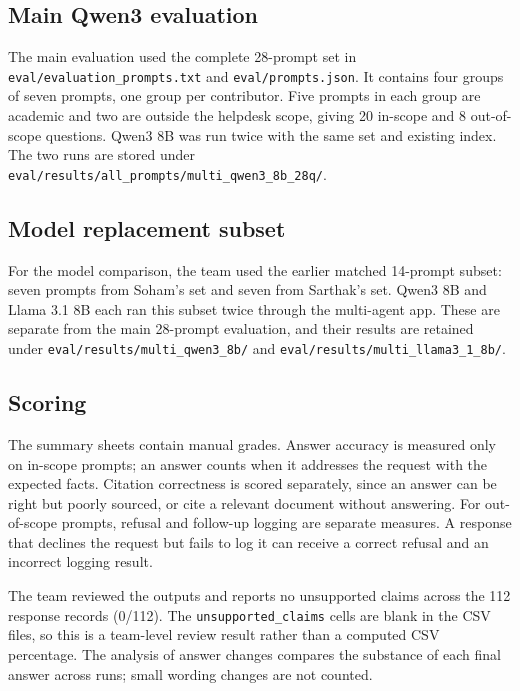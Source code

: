 \documentclass[11pt,a4paper]{article}
\begin{document}
\subsection{Main Qwen3 evaluation}

The main evaluation used the complete 28-prompt set in \texttt{eval/evaluation\_prompts.txt} and \texttt{eval/prompts.json}. It contains four groups of seven prompts, one group per contributor. Five prompts in each group are academic and two are outside the helpdesk scope, giving 20 in-scope and 8 out-of-scope questions. Qwen3 8B was run twice with the same set and existing index. The two runs are stored under \texttt{eval/results/all\_prompts/multi\_qwen3\_8b\_28q/}.

\subsection{Model replacement subset}

For the model comparison, the team used the earlier matched 14-prompt subset: seven prompts from Soham's set and seven from Sarthak's set. Qwen3 8B and Llama 3.1 8B each ran this subset twice through the multi-agent app. These are separate from the main 28-prompt evaluation, and their results are retained under \texttt{eval/results/multi\_qwen3\_8b/} and \texttt{eval/results/multi\_llama3\_1\_8b/}.

\subsection{Scoring}

The summary sheets contain manual grades. Answer accuracy is measured only on in-scope prompts; an answer counts when it addresses the request with the expected facts. Citation correctness is scored separately, since an answer can be right but poorly sourced, or cite a relevant document without answering. For out-of-scope prompts, refusal and follow-up logging are separate measures. A response that declines the request but fails to log it can receive a correct refusal and an incorrect logging result.

The team reviewed the outputs and reports no unsupported claims across the 112 response records (0/112). The \texttt{unsupported\_claims} cells are blank in the CSV files, so this is a team-level review result rather than a computed CSV percentage. The analysis of answer changes compares the substance of each final answer across runs; small wording changes are not counted.
\end{document}
